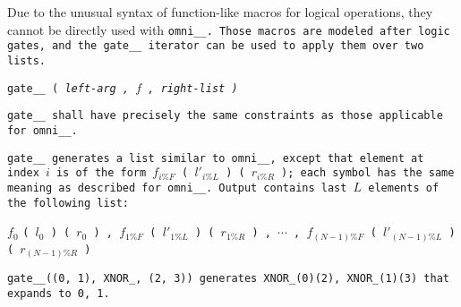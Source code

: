 Due to the unusual syntax of function-like macros for logical operations,
they cannot be directly used with \tt{omni__}.
Those macros are modeled after logic gates,
and the \tt{gate__} iterator can be used to apply them over two lists.


\tt{gate__ (} \it{left-arg} \tt{,} $f$ \tt{,} \it{right-list} \tt{)}


\tt{gate__} shall have precisely the same
constraints as those applicable for \tt{omni__}.


\tt{gate__} generates a list similar to \tt{omni__}, except that element at index
$i$ is of the form $f_{i\%F}$ \tt{(} $l'_{i\%L}$ \tt{) (} $r_{i\%R}$ \tt{)};
each symbol has the same meaning as described for \tt{omni__}.
Output contains last $L$ elements of the following list:

\centerline
{
$f_0$ \tt{(} $l_0$ \tt{) (} $r_0$ \tt{) ,}
$f_{1\%F}$ \tt{(} $l'_{1\%L}$ \tt{) (} $r_{1\%R}$ \tt{) ,}
$\cdots$ \tt{,}
$f_{(N - 1)\%F}$ \tt{(} $l'_{(N - 1)\%L}$ \tt{) (} $r_{(N - 1)\%R}$ \tt{)}
}

\example \tt{gate__((0, 1), XNOR_, (2, 3))} generates
\tt{XNOR_(0)(2), XNOR_(1)(3)} that expands to \tt{0, 1}.

